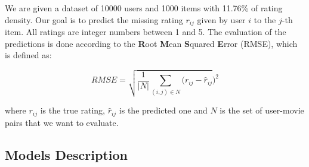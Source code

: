 \documentclass[10pt,conference,compsocconf]{IEEEtran}
\begin{document}
We are given a dataset of 10000 users and 1000 items with 11.76\% of rating density. Our goal is to predict the missing rating $r_{ij}$ given by user $i$ to the $j$-th item. All ratings are integer numbers between 1 and 5. The evaluation of the predictions is done according to the \textbf{R}oot \textbf{M}ean \textbf{S}quared \textbf{E}rror (RMSE), which is defined as:

$$
RMSE = \sqrt{\frac{1}{\vert N \vert} \sum_{(i,j)\in N} (r_{ij} - \hat{r}_{ij}})^2
$$

\noindent where $r_{ij}$ is the true rating, $\hat{r}_{ij}$ is the predicted one and $N$ is the set of user-movie pairs that we want to evaluate.

\subsection{Models Description}

\end{document}

